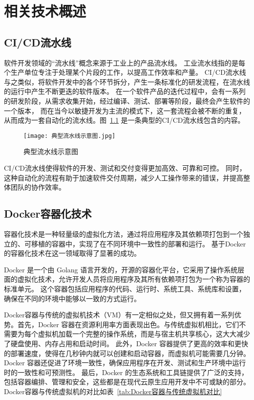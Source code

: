 
\chapter{相关技术概述}

\section{CI/CD流水线}
软件开发领域的“流水线”概念来源于工业上的产品流水线。
工业流水线指的是每个生产单位专注于处理某个片段的工作，以提高工作效率和产量。
CI/CD流水线与之类似，将软件开发中的各个环节拆分，产生一条标准化的研发流程，在流水线的运行中产生不断更迭的软件版本。
在一个软件产品的迭代过程中，会有一系列的研发阶段，从需求收集开始，经过编译、测试、部署等阶段，最终会产生软件的一个版本，
而在当今以敏捷开发为主流的模式下，这一套流程会被不断的重复，从而成为一套自动化的流水线。图~\ref{fig:典型流水线示意图} 是一条典型的CI/CD流水线包含的内容。

\begin{figure}[h]
    \centering
    \texttt{[image: 典型流水线示意图.jpg]}
    \caption{典型流水线示意图}
    \label{fig:典型流水线示意图}
  \end{figure}

CI/CD流水线使得软件的开发、测试和交付变得更加高效、可靠和可控。
同时，这种自动化的流程有助于加速软件交付周期，减少人工操作带来的错误，并提高整体团队的协作效率。

\section{Docker容器化技术}
容器化技术是一种轻量级的虚拟化方法，通过将应用程序及其依赖项打包到一个独立的、可移植的容器中，实现了在不同环境中一致性的部署和运行。
基于Docker的容器化技术在这一领域取得了显著的成功。

Docker 是一个由 Golang 语言开发的，开源的容器化平台，它采用了操作系统层面的虚拟化技术，允许开发人员将应用程序及其所有依赖项打包为一个称为容器的标准单元\cite{第二章Docker}。
这个容器包括应用程序的代码、运行时、系统工具、系统库和设置，确保在不同的环境中能够以一致的方式运行。

Docker容器与传统的虚拟机技术（VM）有一定相似之处，但又拥有着一系列优势。首先，Docker 容器在资源利用率方面表现出色。与传统虚拟机相比，它们不需要为每个虚拟机加载一个完整的操作系统，而是与宿主机共享核心，这大大减少了硬盘使用、内存占用和启动时间。
此外，Docker 容器提供了更高的效率和更快的部署速度，使得在几秒钟内就可以创建和启动容器，而虚拟机可能需要几分钟。
Docker 容器还促进了环境一致性，确保应用程序在开发、测试和生产环境中运行时的一致性和可预测性。
最后，Docker 的生态系统和工具链提供了广泛的支持，包括容器编排、管理和安全，这些都是在现代云原生应用开发中不可或缺的部分。
Docker容器与传统虚拟机的对比如表~\ref{tab:Docker容器与传统虚拟机对比}

